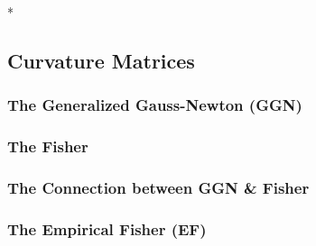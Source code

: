 \switchcolumn[0]*
\subsection{Curvature Matrices}
\subsubsection{The Generalized Gauss-Newton (GGN)}
\subsubsection{The Fisher}
\subsubsection{The Connection between GGN \& Fisher}
\subsubsection{The Empirical Fisher (EF)}

